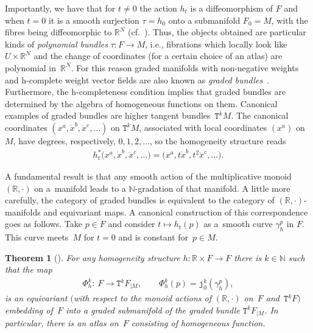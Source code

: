 \documentclass[10pt,a4paper]{amsart}
\def\sT{{\mathtt T}}
\numberwithin{equation}{section}
\newtheorem{Theorem}{Theorem}[section]
\begin{document}
Importantly, we have  that for $t \neq 0$ the action $h_{t}$ is a dif\/feomorphism of $F$ and when $t=0$ it is a smooth surjection $\tau=h_0$ onto a submanifold $F_{0}=M$, with the f\/ibres being dif\/feomorphic to $\mathbb{R}^{N}$ (cf.~\cite{Grabowski2012}).  Thus, the objects obtained are particular kinds of \emph{polynomial bundles} $\tau\colon F\to M$, i.e., f\/ibrations which locally look like $U\times{\mathbb R}^N$ and the change of coordinates (for a certain choice of an atlas) are polynomial in~${\mathbb R}^N$. For this reason graded manifolds with non-negative weights and h-complete weight vector f\/ields are also known as \emph{graded bundles}~\cite{Grabowski2012}. Furthermore, the h-completeness condition  implies that  graded bundles are determined by the algebra of homogeneous functions on them.  Canonical examples of  graded bundles are higher tangent bundles~$\sT^kM$.
The canonical coordinates $(x^a,\dot x^b,\ddot x^c,\dots)$ on $\sT^kM$, associated with local coordinates $(x^a)$ on~$M$, have degrees, respectively, $0,1,2,\dots$, so the homogeneity structure reads
\begin{gather*}
h^{*}_t\big(x^a,\dot x^b,\ddot x^c,\dots\big)=\big(x^a,t\dot x^b,t^2\ddot x^c,\dots\big) .
\end{gather*}

A fundamental result is that any smooth action of the multiplicative monoid  $({\mathbb R},\cdot)$ on a~mani\-fold leads to a $\mathbb{N}$-gradation of that manifold. A little more carefully, the category of graded bundles is  equivalent to the category of $(\mathbb{R}, \cdot)$-manifolds and equivariant maps. A canonical construction of this correspondence goes as follows.
Take $ p \in F$ and consider $t \mapsto h_{t}(p)$ as a~smooth curve $\gamma_h^p$ in $F$. This curve meets~$M$ for $t=0$ and is constant for~$p\in M$.

\begin{Theorem}[\cite{Grabowski2012}]
For any homogeneity structure $h\colon {\mathbb R}\times F\to F$ there is $k\in\mathbb{N}$ such that
the map
\begin{gather}
\label{Phi}
\Phi_h^k\colon \ F\to \sT^k F_{|M} ,\qquad \Phi^k_h(p)={\mathtt j}^k_0(\gamma_h^p) ,
\end{gather}
is an equivariant $($with respect to the monoid actions of $({\mathbb R},\cdot)$ on~$F$ and~$\sT^k F)$ embedding of~$F$ into a graded submanifold of the graded bundle $\sT^k F_{|M}$. In particular, there is an atlas on~$F$ consisting of homogeneous function.
\end{Theorem}
\end{document}
